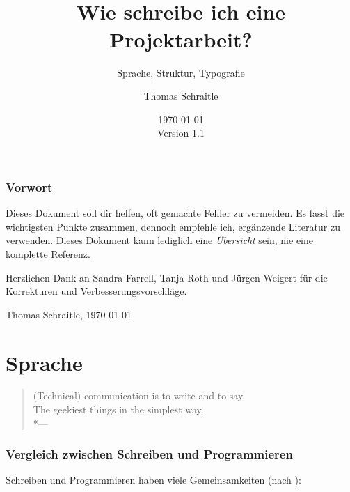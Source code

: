 \documentclass[a4paper,titlepage=true,twoside]{scrartcl}
\title{\hspace{0pt}\\[2ex]Wie schreibe ich eine Projektarbeit?}
\subtitle{Sprache, Struktur, Typografie}
\author{Thomas Schraitle\\\email{toms@suse.de}}
\date{\today\\Version 1.1}
\newenvironment{epigraph}[1]%
{\sbox{\Epigraph}{\textit{#1}}
\begin{quote}}%
{%
\\*\hspace{0pt}---\usebox{\Epigraph}%
\end{quote}}
\begin{document}
\maketitle
\tableofcontents

\section*{Vorwort}
Dieses Dokument soll dir helfen, oft gemachte Fehler zu vermeiden.
Es fasst die wichtigsten Punkte zusammen, dennoch empfehle ich,
ergänzende Literatur zu verwenden. Dieses Dokument kann
lediglich eine \emph{Übersicht} sein, nie eine komplette Referenz.

Herzlichen Dank an Sandra Farrell, Tanja Roth und Jürgen Weigert
für die Korrekturen und Verbesserungsvorschläge.

\vspace{1.5em}
\noindent Thomas Schraitle, \today


\newpage
\part{Sprache}
\begin{epigraph}{Isaac Goldberg}
 (Technical) communication is to write and to say\\
 The geekiest things in the simplest way.
\end{epigraph}

\section{Vergleich zwischen Schreiben und Programmieren}
Schreiben und Programmieren haben viele Gemeinsamkeiten (nach \cite{bib.rosenberg}):
\end{document}
